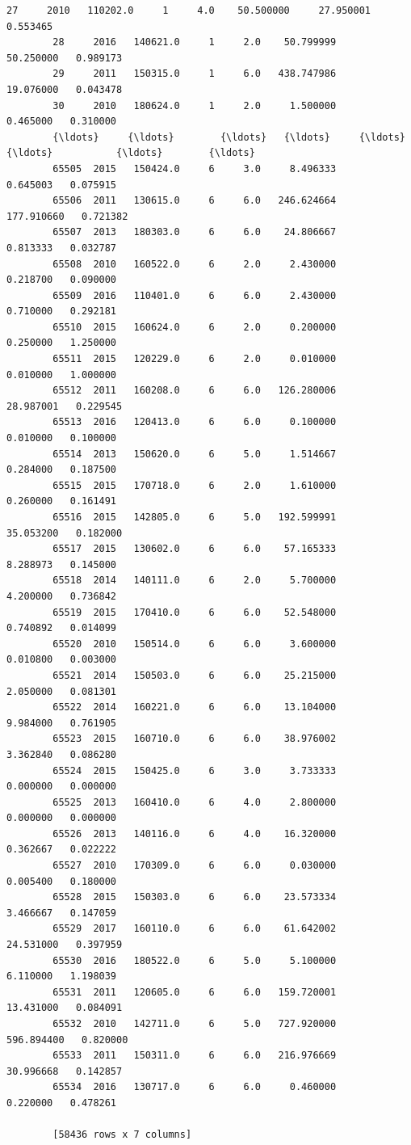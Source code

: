 \documentclass[11pt]{article}
\begin{document}
\begin{Verbatim}[commandchars=\\\{\}]
        27     2010   110202.0     1     4.0    50.500000     27.950001   0.553465
        28     2016   140621.0     1     2.0    50.799999     50.250000   0.989173
        29     2011   150315.0     1     6.0   438.747986     19.076000   0.043478
        30     2010   180624.0     1     2.0     1.500000      0.465000   0.310000
        {\ldots}     {\ldots}        {\ldots}   {\ldots}     {\ldots}          {\ldots}           {\ldots}        {\ldots}
        65505  2015   150424.0     6     3.0     8.496333      0.645003   0.075915
        65506  2011   130615.0     6     6.0   246.624664    177.910660   0.721382
        65507  2013   180303.0     6     6.0    24.806667      0.813333   0.032787
        65508  2010   160522.0     6     2.0     2.430000      0.218700   0.090000
        65509  2016   110401.0     6     6.0     2.430000      0.710000   0.292181
        65510  2015   160624.0     6     2.0     0.200000      0.250000   1.250000
        65511  2015   120229.0     6     2.0     0.010000      0.010000   1.000000
        65512  2011   160208.0     6     6.0   126.280006     28.987001   0.229545
        65513  2016   120413.0     6     6.0     0.100000      0.010000   0.100000
        65514  2013   150620.0     6     5.0     1.514667      0.284000   0.187500
        65515  2015   170718.0     6     2.0     1.610000      0.260000   0.161491
        65516  2015   142805.0     6     5.0   192.599991     35.053200   0.182000
        65517  2015   130602.0     6     6.0    57.165333      8.288973   0.145000
        65518  2014   140111.0     6     2.0     5.700000      4.200000   0.736842
        65519  2015   170410.0     6     6.0    52.548000      0.740892   0.014099
        65520  2010   150514.0     6     6.0     3.600000      0.010800   0.003000
        65521  2014   150503.0     6     6.0    25.215000      2.050000   0.081301
        65522  2014   160221.0     6     6.0    13.104000      9.984000   0.761905
        65523  2015   160710.0     6     6.0    38.976002      3.362840   0.086280
        65524  2015   150425.0     6     3.0     3.733333      0.000000   0.000000
        65525  2013   160410.0     6     4.0     2.800000      0.000000   0.000000
        65526  2013   140116.0     6     4.0    16.320000      0.362667   0.022222
        65527  2010   170309.0     6     6.0     0.030000      0.005400   0.180000
        65528  2015   150303.0     6     6.0    23.573334      3.466667   0.147059
        65529  2017   160110.0     6     6.0    61.642002     24.531000   0.397959
        65530  2016   180522.0     6     5.0     5.100000      6.110000   1.198039
        65531  2011   120605.0     6     6.0   159.720001     13.431000   0.084091
        65532  2010   142711.0     6     5.0   727.920000    596.894400   0.820000
        65533  2011   150311.0     6     6.0   216.976669     30.996668   0.142857
        65534  2016   130717.0     6     6.0     0.460000      0.220000   0.478261
        
        [58436 rows x 7 columns]
\end{Verbatim}
            
\end{document}

